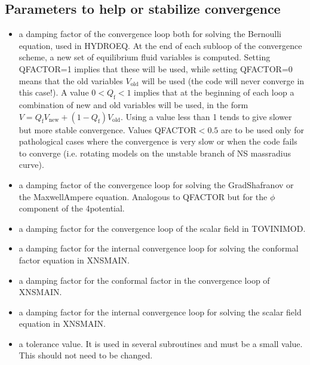 \documentclass[letterpaper,10pt,english]{sphinxmanual}
\begin{document}
\subsection{Parameters to help or stabilize convergence}
\label{\detokenize{user_params:parameters-to-help-or-stabilize-convergence}}\begin{itemize}
\item {} 
\sphinxAtStartPar
{} \sphinxhyphen{} a damping factor of the convergence loop both for solving the Bernoulli equation, used in HYDROEQ.
At the end of each sub\sphinxhyphen{}loop of the convergence scheme, a new set of equilibrium fluid variables is
computed. Setting QFACTOR=1 implies that these will be used, while setting QFACTOR=0 means that
the old variables \(V_\mathrm{old}\) will be used (the code will never converge in this case!). A value \(0 < Q_\mathrm{f} < 1\)
implies that at the beginning of each loop a combination of new and old variables will be used, in the
form \(V = Q_\mathrm{f}V_\mathrm{new} + (1 - Q_\mathrm{f})V_\mathrm{old}\).
Using a value less than 1 tends to give slower but more stable convergence. Values QFACTOR\( < 0.5\)
are to be used only for pathological cases where the convergence is very slow or when the code fails
to converge (i.e. rotating models on the unstable branch of NS mass\sphinxhyphen{}radius curve).


\item {} 
\sphinxAtStartPar
{} \sphinxhyphen{} a damping factor of the convergence loop for solving the Grad\sphinxhyphen{}Shafranov or the Maxwell\sphinxhyphen{}Ampere equation. Analogous to QFACTOR but for the \(\phi\)\sphinxhyphen{}component of the 4\sphinxhyphen{}potential.


\item {} 
\sphinxAtStartPar
{} \sphinxhyphen{} a damping factor for the convergence loop of the scalar field in TOVINIMOD.


\item {} 
\sphinxAtStartPar
{} \sphinxhyphen{} a damping factor for the internal convergence loop for solving the conformal factor equation in XNSMAIN.


\item {} 
\sphinxAtStartPar
{} \sphinxhyphen{} a damping factor for the conformal factor in the convergence loop of XNSMAIN.


\item {} 
\sphinxAtStartPar
{} \sphinxhyphen{} a damping factor for the internal convergence loop for solving the scalar field equation in XNSMAIN.


\item {} 
\sphinxAtStartPar
{} \sphinxhyphen{} a tolerance value. It is used in several subroutines and must be a small value. This should not
need to be changed.


\end{itemize}
\end{document}
